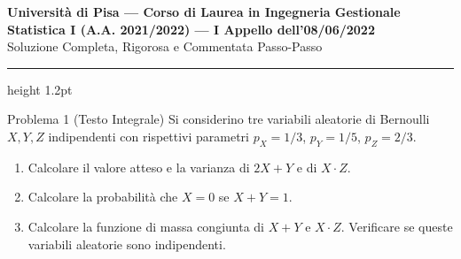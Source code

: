 \documentclass[11pt,a4paper]{article}
\begin{document}
\begin{center}
    {\LARGE\bfseries\color{navyblue} Università di Pisa --- Corso di Laurea in Ingegneria Gestionale}\\[0.4em]
    {\Large\bfseries Statistica I (A.A. 2021/2022) --- I Appello dell'08/06/2022}\\[0.3em]
    {\large\textsf{Soluzione Completa, Rigorosa e Commentata Passo-Passo}}
\end{center}
\vspace{0.5em}
\hrule height 1.2pt
\vspace{1.5em}

\begin{problemabox}{Problema 1 (Testo Integrale)}
Si considerino tre variabili aleatorie di Bernoulli $X,Y,Z$ indipendenti con rispettivi parametri $p_X = 1/3$, $p_Y = 1/5$, $p_Z = 2/3$.
\begin{enumerate}[label=(\alph*)]
    \item Calcolare il valore atteso e la varianza di $2X+ Y$ e di $X\cdot Z$.
    \item Calcolare la probabilità che $X = 0$ se $X+ Y = 1$.
    \item Calcolare la funzione di massa congiunta di $X+ Y$ e $X\cdot Z$. Verificare se queste variabili aleatorie sono indipendenti.
\end{enumerate}
\end{problemabox}
\end{document}
